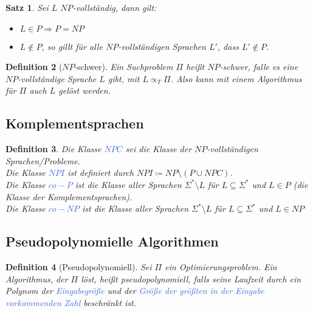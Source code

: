 \documentclass[11pt]{article}
\newcommand{\tcol}[1]{\textcolor{RoyalBlue}{#1}}
\theoremstyle{break}
\newtheorem{satz}{Satz}[section]
\newtheorem{defi}[satz]{Definition}
\begin{document}
\begin{satz}
Sei $L$ $NP$-vollständig, dann gilt:
\begin{itemize}
\item $L\in P\Rightarrow P=NP$
\item $L\notin P$, so gillt für alle $NP$-vollständigen Sprachen $L'$, dass $L'\notin P$.
\end{itemize}
\end{satz}


\begin{defi}[$NP$-schwer]
Ein Suchproblem $\Pi$ heißt $NP$-schwer, falle es eine $NP$-vollständige Sprache $L$ gibt, mit $L\propto_T\Pi$. Also kann mit einem Algorithmus für $\Pi$ auch $L$ gelöst werden.
\end{defi}


\subsection{Komplementsprachen}

\begin{defi}
Die Klasse \tcol{$NPC$} sei die Klasse der $NP$-vollständigen Sprachen/Probleme.\\
Die Klasse \tcol{$NPI$} ist definiert durch $NPI\coloneqq NP\setminus(P\cup NPC)$.\\
Die Klasse \tcol{$co-P$} ist die Klasse aller Sprachen $\Sigma^*\setminus L$ für $L\subseteq\Sigma^*$ und $L\in P$ (die Klasse der Komplementsprachen).\\
Die Klasse \tcol{$co-NP$} ist die Klasse aller Sprachen $\Sigma^*\setminus L$ für $L\subseteq\Sigma^*$ und $L\in NP$
\end{defi}


\subsection{Pseudopolynomielle Algorithmen}

\begin{defi}[Pseudopolynomiell]
Sei $\Pi$ ein Optimierungsproblem. Ein Algorithmus, der $\Pi$ löst, heißt pseudopolynomiell, falls seine Laufzeit durch ein Polynom der \tcol{Eingabegröße} und der \tcol{Größe der größten in der Eingabe vorkommenden Zahl} beschränkt ist.
\end{defi}
\end{document}
